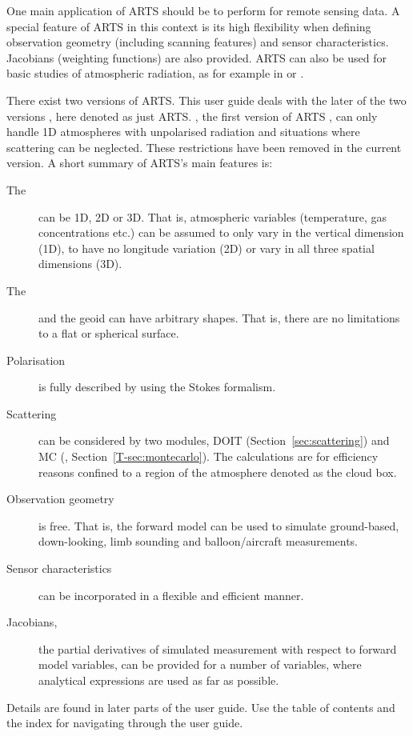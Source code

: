 One main application of ARTS should be to perform
 for remote sensing data. A special feature of
ARTS in this context is its high flexibility when defining observation
geometry (including scanning features) and sensor
characteristics. Jacobians (weighting functions) are also
provided. ARTS can also be used for basic studies of atmospheric
radiation, as for example in \citet{buehler:recen:06} or
\citet{john:under:06}.

There exist two versions of ARTS. This user guide deals with the later
of the two versions \citep{eriksson:arts2:11}, here denoted as just
ARTS. , the first version of ARTS
\citep{buehler:artst:05}, can only handle 1D atmospheres with
unpolarised radiation and situations where scattering can be
neglected.  These restrictions have been removed in the current
version. A short summary of ARTS's main features is:
\begin{description}
\item[The ] can be 1D, 2D or 3D. That is, atmospheric
  variables (temperature, gas concentrations etc.) can be assumed to
  only vary in the vertical dimension (1D), to have no longitude
  variation (2D) or vary in all three spatial dimensions (3D).
\item[The ] and the geoid can have arbitrary shapes. That is,
  there are no limitations to a flat or spherical surface.
\item[Polarisation] is fully described by using the Stokes formalism.
\item[Scattering] can be considered by two modules, DOIT
  (Section~\ref{sec:scattering}) and MC
  (\theory, Section~\ref{T-sec:montecarlo}). The  calculations are for
  efficiency reasons confined to a region of the atmosphere denoted as
  the cloud box.
\item[Observation geometry] is free. That is, the forward model can be
  used to simulate ground-based, down-looking, limb sounding and
  balloon/aircraft measurements.
\item[Sensor characteristics] can be incorporated in a flexible and
  efficient manner.
\item[Jacobians,] the partial derivatives of simulated measurement
  with respect to forward model variables, can be provided for a
  number of variables, where analytical expressions are used as far as
  possible.
\end{description}
Details are found in later parts of the user guide. Use the table of
contents and the index for navigating through the user guide.



